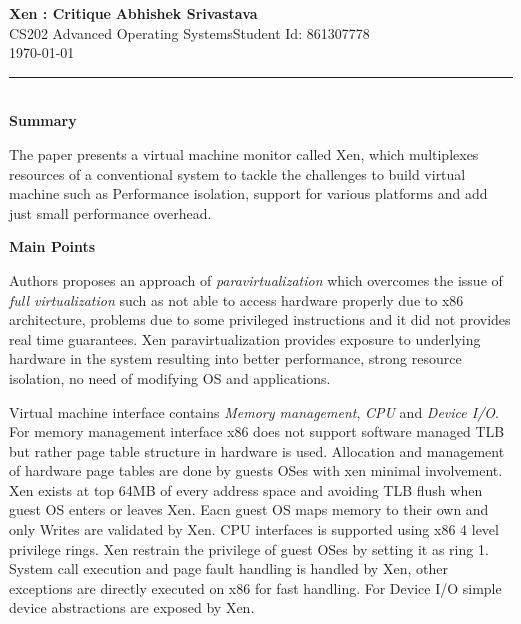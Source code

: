\documentclass[a4paper, 11pt]{article}
\begin{document}
\noindent
\large\textbf{Xen : Critique} \hfill \textbf{Abhishek Srivastava} \\
\normalsize CS202 Advanced Operating Systems\hfill Student Id: 861307778 \\
\hfill \today \\
\hrule

\noindent
\\
\large\textbf{Summary}

The paper presents a virtual machine monitor called Xen, which multiplexes resources of a conventional system to tackle the challenges to build virtual machine such as Performance isolation, support for various platforms and add just small performance overhead.

\noindent
\large\textbf{Main Points}

Authors proposes an approach of \emph{paravirtualization} which overcomes the issue of \emph{full virtualization} such as not able to access hardware properly due to x86 architecture, problems due to some privileged instructions and it did not provides real time guarantees. Xen paravirtualization provides exposure to underlying hardware in the system resulting into better performance, strong resource isolation, no need of modifying OS and applications. 

Virtual machine interface contains \emph{Memory management}, \emph{CPU} and \emph{Device I/O}. For memory management interface x86 does not support software managed TLB but rather page table structure in hardware is used. Allocation and management of hardware page tables are done by guests OSes with xen minimal involvement. Xen exists at top 64MB of every address space and avoiding TLB flush when guest OS enters or leaves Xen. Eacn guest OS maps memory to their own and only Writes are validated by Xen. CPU interfaces is supported using x86 4 level privilege rings. Xen restrain the  privilege of guest OSes by setting it as ring 1. System call execution and page fault handling is handled by Xen, other exceptions are directly executed on x86 for fast handling. For Device I/O simple device abstractions are exposed by Xen.
\end{document}
